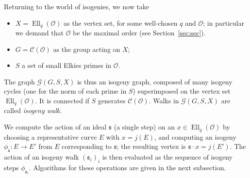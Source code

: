 \documentclass{llncs}
\newcommand{\Cl}{\mathcal{C}}
\newcommand{\Graph}{\mathcal{G}}
\renewcommand{\O}{\mathcal{O}}
\renewcommand{\frak}{\mathfrak}
\DeclareMathOperator{\Ell}{Ell}
\begin{document}
Returning to the world of isogenies,
we now take
\begin{itemize}
    \item $X=\Ell_q(\O)$ as the vertex set, for some well-chosen $q$ and $\O$;
        in particular we demand that $\O$ be the maximal order (see Section~\ref{sec:sec}).
    \item $G=\Cl(\O)$ as the group acting on $X$;
    \item $S$ a set of small Elkies primes in $\O$.
\end{itemize}
The graph $\Graph(G,S,X)$ is thus an isogeny graph, 
composed of many isogeny cycles (one for the norm of each prime in $S$) 
superimposed on the vertex set $\Ell_q(\O)$.
It is connected if $S$ generates $\Cl(\O)$.
Walks in $\Graph(G,S,X)$ are called \emph{isogeny walk}. 





We compute the action of
an ideal $\frak s$ (a single step)
on an $x∈\Ell_q(\O)$ 
by choosing a representative curve $E$ with $x = j(E)$,
and computing an isogeny $ϕ_{\frak s}:E→E'$ from $E$
corresponding to $\frak{s}$;
the resulting vertex is $\frak s \cdot x = j(E')$.
The action of an isogeny walk $(\frak s_i)_i$
is then evaluated as the sequence of isogeny steps $ϕ_{\frak s_i}$. 
Algorithms for these operations are given in the next subsection. 
\end{document}
